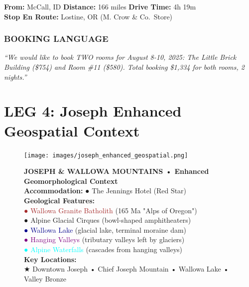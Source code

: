\documentclass[
  11pt,
]{article}
\begin{document}
\textbf{\textcolor{secondary}{From:}} McCall, ID \textbar{}
\textbf{\textcolor{secondary}{Distance:}} 166 miles \textbar{}
\textbf{\textcolor{secondary}{Drive Time:}} 4h 19m\\
\textbf{\textcolor{secondary}{Stop En Route:}} Lostine, OR (M. Crow \&
Co.~Store)

\subsubsection{\texorpdfstring{\textcolor{primary}{BOOKING LANGUAGE}}{}}\label{section-29}

\emph{``We would like to book TWO rooms for August 8-10, 2025: The
Little Brick Building (\$754) and Room \#11 (\$580). Total booking
\$1,334 for both rooms, 2 nights.''}

\newpage

\section{\texorpdfstring{\textcolor{primary}{LEG 4: Joseph Enhanced Geospatial Context}}{}}\label{section-30}

\begin{figure}[H]
\centering
\texttt{[image: images/joseph\_enhanced\_geospatial.png]}
\caption{\textbf{\textcolor{primary}{JOSEPH \& WALLOWA MOUNTAINS • Enhanced Geomorphological Context}} \\ 
\textbf{\textcolor{secondary}{Accommodation:}} \textcolor{mapred}{●} The Jennings Hotel (Red Star) \\
\textbf{\textcolor{secondary}{Geological Features:}} \\
\textcolor{brown}{●} \textcolor{brown}{Wallowa Granite Batholith} (165 Ma "Alps of Oregon") \\
\textcolor{mapblue}{●} \textcolor{mapblue}{Alpine Glacial Cirques} (bowl-shaped amphitheaters) \\
\textcolor{darkblue}{●} \textcolor{darkblue}{Wallowa Lake} (glacial lake, terminal moraine dam) \\
\textcolor{purple}{●} \textcolor{purple}{Hanging Valleys} (tributary valleys left by glaciers) \\
\textcolor{cyan}{●} \textcolor{cyan}{Alpine Waterfalls} (cascades from hanging valleys) \\
\textbf{\textcolor{secondary}{Key Locations:}} \\
\textcolor{mapred}{★} Downtown Joseph • Chief Joseph Mountain • Wallowa Lake • Valley Bronze}
\end{figure}
\end{document}

